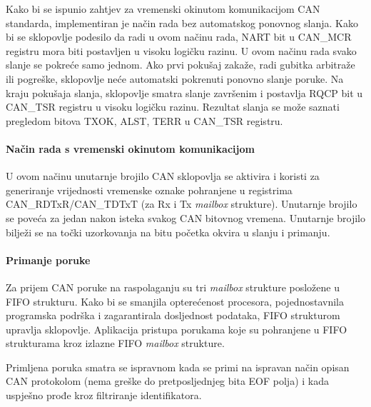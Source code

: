 Kako bi se ispunio zahtjev za vremenski okinutom komunikacijom CAN standarda, implementiran je način rada bez automatskog ponovnog slanja. Kako bi se sklopovlje podesilo da radi u ovom načinu rada, NART bit u CAN\_MCR registru mora biti postavljen u visoku logičku razinu. U ovom načinu rada svako slanje se pokreće samo jednom. Ako prvi pokušaj zakaže, radi gubitka arbitraže ili pogreške, sklopovlje neće automatski pokrenuti ponovno slanje poruke. Na kraju pokušaja slanja, sklopovlje smatra slanje završenim i postavlja RQCP bit u CAN\_TSR registru u visoku logičku razinu. Rezultat slanja se može saznati pregledom bitova TXOK, ALST, TERR u CAN\_TSR registru.

\paragraph{Način rada s vremenski okinutom komunikacijom}

U ovom načinu unutarnje brojilo CAN sklopovlja se aktivira i koristi za generiranje vrijednosti vremenske oznake pohranjene u registrima CAN\_RDTxR/CAN\_TDTxT (za Rx i Tx \textit{mailbox} strukture). Unutarnje brojilo se poveća za jedan nakon isteka svakog CAN bitovnog vremena. Unutarnje brojilo bilježi se na točki uzorkovanja na bitu početka okvira u slanju i primanju.

\paragraph{Primanje poruke}

Za prijem CAN poruke na raspolaganju su tri \textit{mailbox} strukture posložene u FIFO strukturu. Kako bi se smanjila opterećenost procesora, pojednostavnila programska podrška i zagarantirala dosljednost podataka, FIFO strukturom upravlja sklopovlje. Aplikacija pristupa porukama koje su pohranjene u FIFO strukturama kroz izlazne FIFO \textit{mailbox} strukture.

Primljena poruka smatra se ispravnom kada se primi na ispravan način opisan CAN protokolom (nema greške do pretposljednjeg bita EOF polja) i kada uspješno prođe kroz filtriranje identifikatora.

